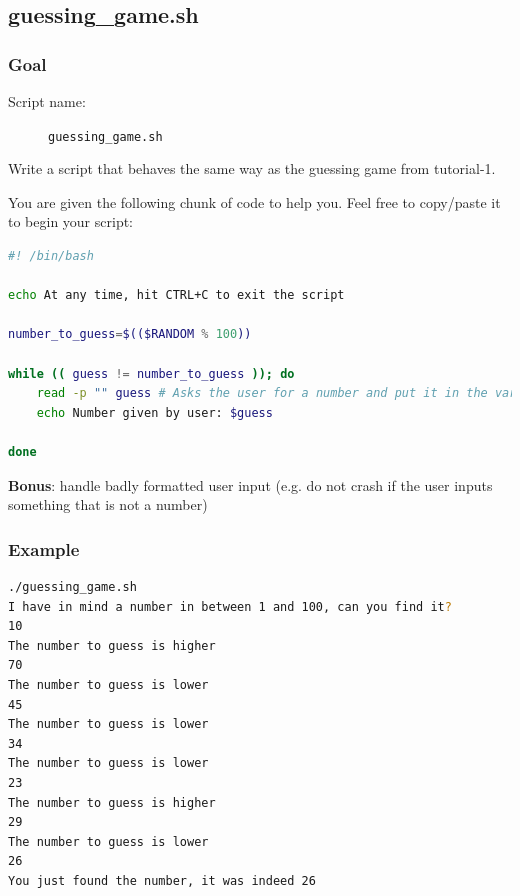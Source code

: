 \documentclass[12pt]{article}
\begin{document}
\subsection{guessing\_game.sh}

\subsubsection{Goal}

\begin{description}
    \item[Script name:] \texttt{guessing\_game.sh}
\end{description}

Write a script that behaves the same way as the guessing game from tutorial-1.

You are given the following chunk of code to help you. Feel free to copy/paste it to begin your script:

\begin{lstlisting}[language=bash]
#! /bin/bash

echo At any time, hit CTRL+C to exit the script

number_to_guess=$(($RANDOM % 100))

while (( guess != number_to_guess )); do
	read -p "" guess # Asks the user for a number and put it in the variable "guess"
	echo Number given by user: $guess

done
\end{lstlisting}

\textbf{Bonus}: handle badly formatted user input (e.g. do not crash if the user inputs something that is not a number)%

\subsubsection{Example}

\begin{lstlisting}[language=bash]
./guessing_game.sh 
I have in mind a number in between 1 and 100, can you find it?
10
The number to guess is higher
70
The number to guess is lower
45
The number to guess is lower
34
The number to guess is lower
23
The number to guess is higher
29
The number to guess is lower
26
You just found the number, it was indeed 26
\end{lstlisting}
\end{document}
